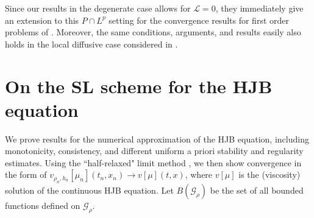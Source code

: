 \documentclass[a4paper,  twoside, 10pt, leqno]{amsart}
\theoremstyle{remark}
\theoremstyle{definition}
\begin{document}
Since our results in the degenerate case allows for $\mathcal L=0$, they immediately give an extension to this $P  \cap L^{p}$ setting for the convergence results for first order problems of \cite{carliniSilva2014semi1st}. Moreover, the same conditions, arguments, and results easily also holds in the local diffusive case considered in \cite{carlini2015semi}. 

\section{On the SL scheme for the HJB equation} \label{sec:HJB}

We prove results for the numerical approximation of the HJB equation, including monotonicity, consistency, and different uniform a priori stability and regularity estimates. Using the ``half-relaxed" limit method \cite{barles1991convergence}, we then show convergence in the form of $v_{\rho_{n}, h_{n}} [ \mu_{n} ] ( t_{n},x_{n} ) \rightarrow v [ \mu ] ( t,x )$, where $v [ \mu ]$ is the (viscosity) solution of the continuous HJB equation. Let $B ( \mathcal{G}_{\rho})$ be the set of all bounded functions defined on  $\mathcal{G}_{\rho}$. 
\end{document}
